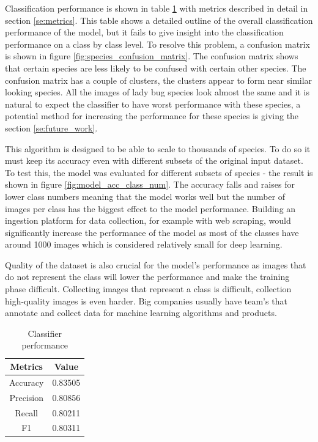 \documentclass[times, utf8, diplomski]{fer}
\begin{document}
Classification performance is shown in table \ref{tb:classifier_performance} with metrics described in detail in section \ref{se:metrics}. This table shows a detailed outline of the overall classification performance of the model, but it fails to give insight into the classification performance on a class by class level. To resolve this problem, a confusion matrix is shown in figure \ref{fig:species_confusion_matrix}. The confusion matrix shows that certain species are less likely to be confused with certain other species. The confusion matrix has a couple of clusters, the clusters appear to form near similar looking species. All the images of lady bug species look almost the same and it is natural to expect the classifier to have worst performance with these species, a potential method for increasing the performance for these species is giving the section \ref{se:future_work}.

This algorithm is designed to be able to scale to thousands of species. To do so it must keep its accuracy even with different subsets of the original input dataset. To test this, the model was evaluated for different subsets of species - the result is shown in figure \ref{fig:model_acc_class_num}. The accuracy falls and raises for lower class numbers meaning that the model works well but the number of images per class has the biggest effect to the model performance. Building an ingestion platform for data collection, for example with web scraping, would significantly increase the performance of the model as most of the classes have around 1000 images which is considered relatively small for deep learning. 

Quality of the dataset is also crucial for the model's performance as images that do not represent the class will lower the performance and make the training phase difficult. Collecting images that represent a class is difficult, collection high-quality images is even harder. Big companies usually have team's that annotate and collect data for machine learning algorithms and products.

\begin{table}
\centering
\caption{Classifier performance}
\label{tb:classifier_performance}
\begin{tabular}{cc}
\hline 
Metrics & Value \\ \hline 
Accuracy &  0.83505\\ 
Precision & 0.80856 \\ 
Recall & 0.80211 \\
F1 & 0.80311 \\
\hline 
\end{tabular} 
\end{table}
\end{document}
